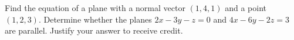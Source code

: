 \documentclass[addpoints]{exam}
\begin{document}
\begin{questions}
\question[30]  Find the equation of a plane with a normal vector $(1,4,1)$ and a point $(1,2,3)$. 
\vspace{0.5cm}
\question[30] Determine whether the planes $2x - 3y - z = 0$ and $4x - 6y - 2z = 3$ are parallel. Justify your answer to receive credit. 



\end{questions}
\end{document}
